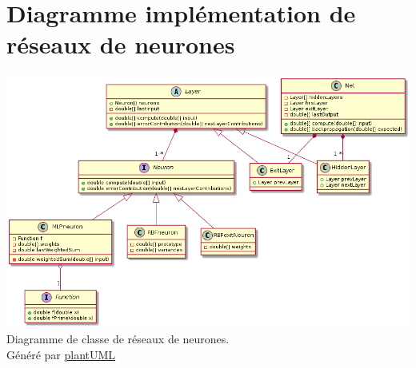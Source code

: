 \documentclass[12pt,a4paper,oneside, titlepage]{article}
\begin{document}

\appendix
\section{Diagramme implémentation de réseaux de neurones}\label{uml}
\includegraphics[width=\textwidth]{../../uml/neurondiag.png}
Diagramme de classe de réseaux de neurones.\\Généré par \href{http://plantuml.com/class-diagram}{plantUML}
\end{document}
